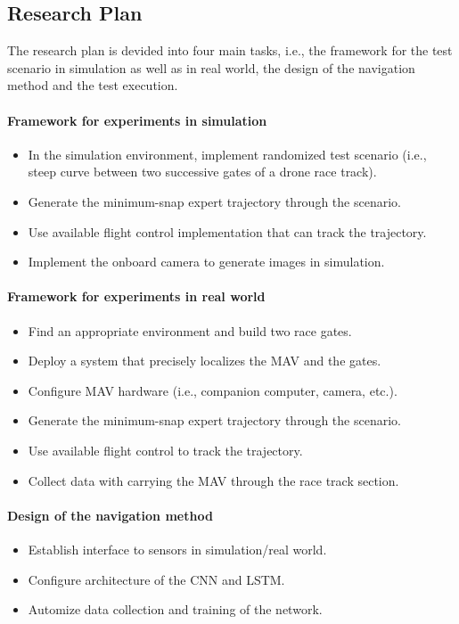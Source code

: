 \subsection{Research Plan}
The research plan is devided into four main tasks, i.e.,
the framework for the test scenario in simulation as well as in real world, the design of the navigation method
and the test execution.



\paragraph{Framework for experiments in simulation}
\begin{itemize}
    \item In the simulation environment, implement randomized test scenario (i.e., steep curve between two successive gates of a drone race track).
    \item Generate the minimum-snap expert trajectory through the scenario.
    \item Use available flight control implementation that can track the trajectory.
    \item Implement the onboard camera to generate images in simulation.
\end{itemize}

\paragraph{Framework for experiments in real world}
\begin{itemize}
    \item Find an appropriate environment and build two race gates.
    \item Deploy a system that precisely localizes the MAV and the gates.
    \item Configure MAV hardware (i.e., companion computer, camera, etc.).
    \item Generate the minimum-snap expert trajectory through the scenario.
    \item Use available flight control to track the trajectory.
    \item Collect data with carrying the MAV through the race track section.
\end{itemize}
    
\paragraph{Design of the navigation method}
\begin{itemize}
    \item Establish interface to sensors in simulation/real world.
    \item Configure architecture of the CNN and LSTM.
    \item Automize data collection and training of the network.
\end{itemize}

